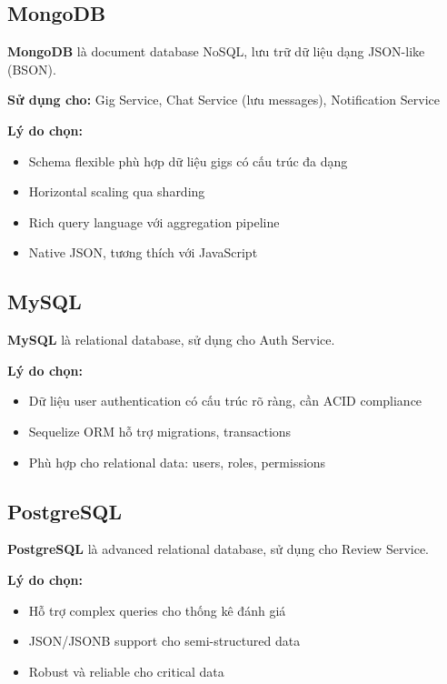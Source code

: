 \documentclass[12pt]{extreport}
\begin{document}
\subsection{MongoDB}

\textbf{MongoDB} là document database NoSQL, lưu trữ dữ liệu dạng JSON-like (BSON).

\textbf{Sử dụng cho:} Gig Service, Chat Service (lưu messages), Notification Service

\textbf{Lý do chọn:}
\begin{itemize}
    \item Schema flexible phù hợp dữ liệu gigs có cấu trúc đa dạng
    \item Horizontal scaling qua sharding
    \item Rich query language với aggregation pipeline
    \item Native JSON, tương thích với JavaScript
\end{itemize}

\subsection{MySQL}

\textbf{MySQL} là relational database, sử dụng cho Auth Service.

\textbf{Lý do chọn:}
\begin{itemize}
    \item Dữ liệu user authentication có cấu trúc rõ ràng, cần ACID compliance
    \item Sequelize ORM hỗ trợ migrations, transactions
    \item Phù hợp cho relational data: users, roles, permissions
\end{itemize}

\subsection{PostgreSQL}

\textbf{PostgreSQL} là advanced relational database, sử dụng cho Review Service.

\textbf{Lý do chọn:}
\begin{itemize}
    \item Hỗ trợ complex queries cho thống kê đánh giá
    \item JSON/JSONB support cho semi-structured data
    \item Robust và reliable cho critical data
\end{itemize}
\end{document}

